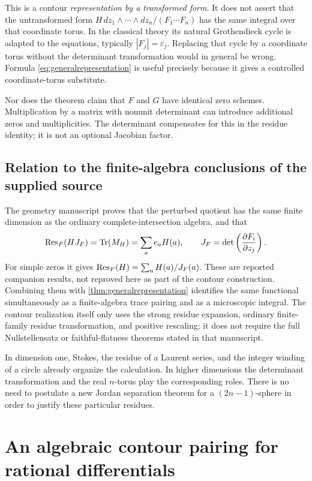 \documentclass[11pt,letterpaper]{article}
\theoremstyle{definition}
\theoremstyle{remark}
\numberwithin{equation}{section}
\begin{document}
This is a contour \emph{representation by a transformed form}. It does not assert that the untransformed form $H\,dz_1\wedge\cdots\wedge dz_n/(F_1\cdots F_n)$ has the same integral over that coordinate torus. In the classical theory its natural Grothendieck cycle is adapted to the equations, typically $|F_j|=\varepsilon_j$. Replacing that cycle by a coordinate torus without the determinant transformation would in general be wrong. Formula \eqref{eq:generalrepresentation} is useful precisely because it gives a controlled coordinate-torus substitute.

Nor does the theorem claim that $F$ and $G$ have identical zero schemes. Multiplication by a matrix with nonunit determinant can introduce additional zeros and multiplicities. The determinant compensates for this in the residue identity; it is not an optional Jacobian factor.

\subsection{Relation to the finite-algebra conclusions of the supplied source}
The geometry manuscript proves that the perturbed quotient has the same finite dimension as the ordinary complete-intersection algebra, and that
\begin{equation}\label{eq:traceresidue}
 \operatorname{Res}_F(HJ_F)=\operatorname{Tr}(M_H)=\sum_a e_aH(a),\qquad
 J_F=\det\left(\frac{\partial F_i}{\partial z_j}\right).
\end{equation}
For simple zeros it gives $\operatorname{Res}_F(H)=\sum_a H(a)/J_F(a)$. These are reported companion results, not reproved here as part of the contour construction. Combining them with \cref{thm:generalrepresentation} identifies the same functional simultaneously as a finite-algebra trace pairing and as a microscopic integral. The contour realization itself only uses the strong residue expansion, ordinary finite-family residue transformation, and positive rescaling; it does not require the full Nullstellensatz or faithful-flatness theorems stated in that manuscript.

In dimension one, Stokes, the residue of a Laurent series, and the integer winding of a circle already organize the calculation. In higher dimensions the determinant transformation and the real $n$-torus play the corresponding roles. There is no need to postulate a new Jordan separation theorem for a $(2n-1)$-sphere in order to justify these particular residues.

\section{An algebraic contour pairing for rational differentials}\label{sec:algebraic}
\end{document}
